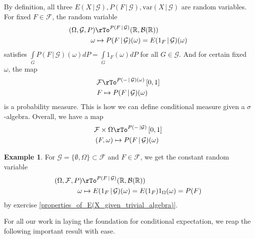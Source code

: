 \documentclass[12pt]{amsart}
\theoremstyle{definition}
\newtheorem{example}[theorem]{Example}
\begin{document}
By definition, all three $E(X \,|\, \mathcal{G}), P(F \,|\, \mathcal{G}), \text{var}(X \,|\, \mathcal{G})$ are random variables. For fixed $F \in \mathcal{F}$, the random variable
\begin{align*}
(\Omega, \mathcal{G}, P) & \rTo^{P(F \,|\, \mathcal{G})} (\mathbb{R}, \mathcal{B}(\mathbb{R})) \\
\omega & \mapsto P(F \,|\, \mathcal{G})(\omega) = E(1_F \,|\, \mathcal{G})(\omega)
\end{align*}
satisfies $\int\limits_G P(F \,|\, \mathcal{G})(\omega)dP = \int\limits_G 1_F (\omega)dP$ for all $G \in \mathcal{G}$. And for certain fixed $\omega$, the map
\begin{align*}
\mathcal{F} & \rTo^{P( - \,|\, \mathcal{G})(\omega)} \left[0,1\right] \\
F & \mapsto P(F \,|\, \mathcal{G})(\omega)
\end{align*}
is a probability measure. This is how we can define conditional measure given a $\sigma$-algebra. Overall, we have a map
\begin{align*}
\mathcal{F} \times \Omega & \rTo^{P( - \,| \mathcal{G})} \, [0,1] \\
(F, \omega) & \mapsto P(F \,|\, \mathcal{G})(\omega)
\end{align*}

\begin{example} For $\mathcal{G} = \{\emptyset, \Omega\} \subset \mathcal{F}$ and $F \in \mathcal{F}$, we get the constant random variable
\begin{align*}
(\Omega, \mathcal{F}, P) & \rTo^{P(F \,|\, \mathcal{G})} (\mathbb{R}, \mathcal{B}(\mathbb{R})) \\
\omega & \mapsto E(1_F \,|\, \mathcal{G})(\omega) = E(1_F)1_{\Omega}(\omega) = P(F)
\end{align*}
by exercise \ref{properties_of_E(X_given_trivial_algebra)}.
\end{example}

For all our work in laying the foundation for conditional expectation, we reap the following important result with ease.
\end{document}
